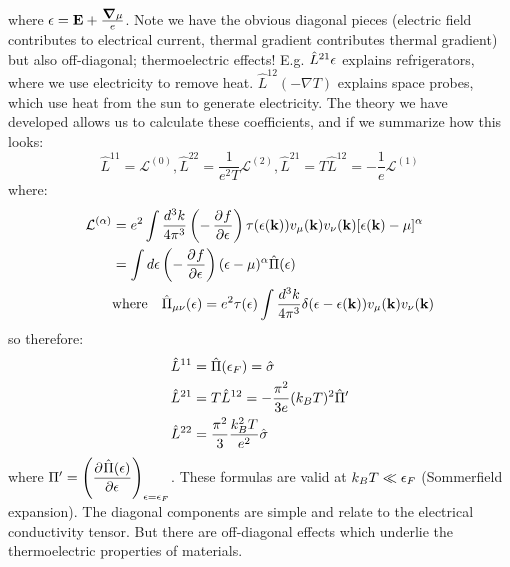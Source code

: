 where $\e = \v{E} + \frac{\nabla \mu}{e}$. Note we have the obvious diagonal pieces (electric field contributes to electrical current, thermal gradient contributes thermal gradient) but also off-diagonal; thermoelectric effects! E.g. $\hat{L}^{21}\epsilon$ explains refrigerators, where we use electricity to remove heat. $\hat{L}^{12}(-\nabla T)$ explains space probes, which use heat from the sun to generate electricity. The theory we have developed allows us to calculate these coefficients, and if we summarize how this looks:
\begin{equation}
    \hat{L}^{11} = \mathcal{L}^{(0)}, \hat{L}^{22} = \frac{1}{e^2T}\mathcal{L}^{(2)}, \hat{L}^{21} = T\hat{L}^{12} = -\frac{1}{e}\mathcal{L}^{(1)}
\end{equation}
where:
\begin{equation}
    \begin{split}
        \mathcal{L}^{(\alpha)} &= e^2 \int \frac{d^3k}{4\pi^3}\left(-\dpd{f}{\e}\right)\tau(\e(\v{k}))v_\mu(\v{k})v_\nu(\v{k})[\e(\v{k}) - \mu]^\alpha
        \\ &= \int d\e \left(-\dpd{f}{\e}\right)(\e - \mu)^\alpha \hat{\Pi}(\e)
        \\ &\text{where} \quad \hat{\Pi}_{\mu\nu}(\e) = e^2\tau(\e)\int \frac{d^3k}{4\pi^3}\delta(\e - \e(\v{k}))v_\mu(\v{k})v_\nu(\v{k})
    \end{split}
\end{equation}
so therefore:
\begin{equation}
    \begin{split}
        \hat{L}^{11} &= \hat{\Pi}(\epsilon_F) = \hat{\sigma}
        \\ \hat{L}^{21} &= T\hat{L}^{12} = -\frac{\pi^2}{3e}(k_B T)^2 \hat{\Pi}'
        \\ \hat{L}^{22} &= \frac{\pi^2}{3}\frac{k_B^2 T}{e^2}\hat{\sigma}
    \end{split}
\end{equation}
where $\Pi' = \left(\dpd{\hat{\Pi}(\e)}{\e}\right)_{\e = \e_F}$. These formulas are valid at $k_B T \ll \epsilon_F$ (Sommerfield expansion). The diagonal components are simple and relate to the electrical conductivity tensor. But there are off-diagonal effects which underlie the thermoelectric properties of materials.

